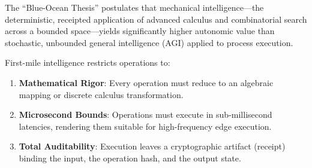 The ``Blue-Ocean Thesis'' postulates that mechanical intelligence---the deterministic, receipted application of advanced calculus and combinatorial search across a bounded space---yields significantly higher autonomic value than stochastic, unbounded general intelligence (AGI) applied to process execution. 

First-mile intelligence restricts operations to:
\begin{enumerate}
    \item \textbf{Mathematical Rigor}: Every operation must reduce to an algebraic mapping or discrete calculus transformation.
    \item \textbf{Microsecond Bounds}: Operations must execute in sub-millisecond latencies, rendering them suitable for high-frequency edge execution.
    \item \textbf{Total Auditability}: Execution leaves a cryptographic artifact (receipt) binding the input, the operation hash, and the output state.
\end{enumerate}
